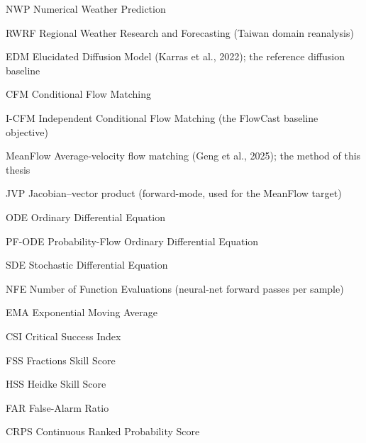 
\begin{denotation}[3cm]

\item[NWP]{Numerical Weather Prediction}
\item[RWRF]{Regional Weather Research and Forecasting (Taiwan domain reanalysis)}
\item[EDM]{Elucidated Diffusion Model (Karras et al., 2022); the reference diffusion baseline}
\item[CFM]{Conditional Flow Matching}
\item[I-CFM]{Independent Conditional Flow Matching (the FlowCast baseline objective)}
\item[MeanFlow]{Average-velocity flow matching (Geng et al., 2025); the method of this thesis}
\item[JVP]{Jacobian--vector product (forward-mode, used for the MeanFlow target)}
\item[ODE]{Ordinary Differential Equation}
\item[PF-ODE]{Probability-Flow Ordinary Differential Equation}
\item[SDE]{Stochastic Differential Equation}
\item[NFE]{Number of Function Evaluations (neural-net forward passes per sample)}
\item[EMA]{Exponential Moving Average}
\item[CSI]{Critical Success Index}
\item[FSS]{Fractions Skill Score}
\item[HSS]{Heidke Skill Score}
\item[FAR]{False-Alarm Ratio}
\item[CRPS]{Continuous Ranked Probability Score}


\end{denotation}
